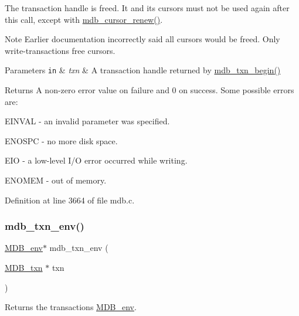 The transaction handle is freed. It and its cursors must not be used again after this call, except with \mbox{\hyperlink{group__mdb_gac8b57befb68793070c85ea813df481af}{mdb\+\_\+cursor\+\_\+renew()}}. \begin{DoxyNote}{Note}
Earlier documentation incorrectly said all cursors would be freed. Only write-\/transactions free cursors. 
\end{DoxyNote}

\begin{DoxyParams}[1]{Parameters}
\mbox{\tt in}  & {\em txn} & A transaction handle returned by \mbox{\hyperlink{group__mdb_gad7ea55da06b77513609efebd44b26920}{mdb\+\_\+txn\+\_\+begin()}} \\
\hline
\end{DoxyParams}
\begin{DoxyReturn}{Returns}
A non-\/zero error value on failure and 0 on success. Some possible errors are\+: 
\begin{DoxyItemize}
\item E\+I\+N\+V\+AL -\/ an invalid parameter was specified. 
\item E\+N\+O\+S\+PC -\/ no more disk space. 
\item E\+IO -\/ a low-\/level I/O error occurred while writing. 
\item E\+N\+O\+M\+EM -\/ out of memory. 
\end{DoxyItemize}
\end{DoxyReturn}


Definition at line 3664 of file mdb.\+c.

\mbox{\label{group__mdb_gaeb17735b8aaa2938a78a45cab85c06a0}} 
\subsubsection{\texorpdfstring{mdb\+\_\+txn\+\_\+env()}{mdb\_txn\_env()}}
{\footnotesize\ttfamily \mbox{\hyperlink{struct_m_d_b__env}{M\+D\+B\+\_\+env}}$\ast$ mdb\+\_\+txn\+\_\+env (\begin{DoxyParamCaption}\item[{\mbox{\hyperlink{struct_m_d_b__txn}{M\+D\+B\+\_\+txn}} $\ast$}]{txn }\end{DoxyParamCaption})}



Returns the transaction\textquotesingle{}s \mbox{\hyperlink{struct_m_d_b__env}{M\+D\+B\+\_\+env}}. 


